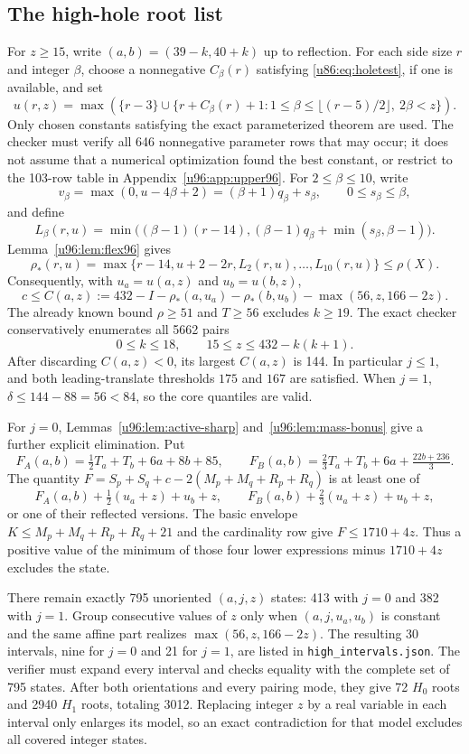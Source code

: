 \documentclass[11pt,a4paper]{article}
\theoremstyle{remark}
\begin{document}
\subsection{The high-hole root list}
For $z\ge15$, write $(a,b)=(39-k,40+k)$ up to reflection. For each side
size $r$ and integer $\beta$, choose a nonnegative $C_\beta(r)$ satisfying
\eqref{u86:eq:holetest}, if one is available, and set
\[
 u(r,z)=\max\left(\{r-3\}\cup
 \{r+C_\beta(r)+1:1\le\beta\le\lfloor(r-5)/2\rfloor,\ 2\beta<z\}\right).
\]
Only chosen constants satisfying the exact parameterized theorem are
used. The checker must verify all 646 nonnegative parameter rows that may
occur; it does not assume that a numerical optimization found the best
constant, or restrict to the 103-row table in Appendix~\ref{u96:app:upper96}.
For $2\le\beta\le10$, write
\[
 v_\beta=\max(0,u-4\beta+2)=(\beta+1)q_\beta+s_\beta,
 \qquad0\le s_\beta\le\beta,
\]
and define
\[
 L_\beta(r,u)=\min\bigl((\beta-1)(r-14),
       (\beta-1)q_\beta+\min(s_\beta,\beta-1)\bigr).
\]
Lemma~\ref{u96:lem:flex96} gives
\[
 \rho_*(r,u)=\max\{r-14,u+2-2r,L_2(r,u),\ldots,L_{10}(r,u)\}
 \le\rho(X).
\]
Consequently, with $u_a=u(a,z)$ and $u_b=u(b,z)$,
\begin{equation}\label{u86:eq:highcap}
 c\le C(a,z):=432-I-\rho_*(a,u_a)-\rho_*(b,u_b)
                  -\max(56,z,166-2z).
\end{equation}
The already known bound $\rho\ge51$ and $T\ge56$ excludes $k\ge19$.
The exact checker conservatively enumerates all 5662 pairs
\[
 0\le k\le18,\qquad15\le z\le432-k(k+1).
\]
After discarding $C(a,z)<0$, its largest $C(a,z)$ is 144. In particular
$j\le1$, and both leading-translate thresholds $175$ and $167$ are
satisfied. When $j=1$, $\delta\le144-88=56<84$, so the core quantiles
are valid.

For $j=0$, Lemmas~\ref{u96:lem:active-sharp} and~\ref{u96:lem:mass-bonus} give a further
explicit elimination. Put
\[
 F_A(a,b)=\tfrac12T_a+T_b+6a+8b+85,\qquad
 F_B(a,b)=\tfrac23T_a+T_b+6a+\tfrac{22b+236}{3}.
\]
The quantity $F=S_p+S_q+c-2(M_p+M_q+R_p+R_q)$ is at least one of
\[
 F_A(a,b)+\tfrac12(u_a+z)+u_b+z,\qquad
 F_B(a,b)+\tfrac23(u_a+z)+u_b+z,
\]
or one of their reflected versions. The basic envelope
$K\le M_p+M_q+R_p+R_q+21$ and the cardinality row give
$F\le1710+4z$. Thus a positive value of the minimum of those four
lower expressions minus $1710+4z$ excludes the state.

There remain exactly 795 unoriented $(a,j,z)$ states: 413 with $j=0$
and 382 with $j=1$. Group consecutive values of $z$ only when
$(a,j,u_a,u_b)$ is constant and the same affine part realizes
$\max(56,z,166-2z)$. The resulting 30 intervals, nine for $j=0$ and 21
for $j=1$, are listed in \texttt{high\_intervals.json}. The verifier must
expand every interval and checks equality with the complete set of
795 states. After both orientations and every pairing mode, they give
72 $H_0$ roots and 2940 $H_1$ roots, totaling 3012. Replacing integer
$z$ by a real variable in each interval only enlarges its model, so an
exact contradiction for that model excludes all covered integer states.
\end{document}
